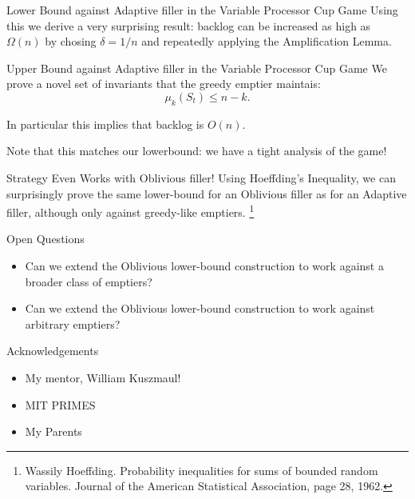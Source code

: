 \documentclass[xcolor=x11names, svgnames, rgb]{beamer}
\begin{document}
\begin{frame}[t]{Lower Bound against Adaptive filler in the Variable Processor Cup Game}
  Using this we derive a very surprising result: backlog can be increased as
  high as $\Omega(n)$ by chosing $\delta = 1/n$ and repeatedly applying the
  Amplification Lemma.
  
\end{frame}

\begin{frame}[t]{Upper Bound against Adaptive filler in the Variable Processor Cup Game}
  We prove a novel set of invariants that the greedy emptier maintais: 
  $$\mu_k(S_t) \le n-k.$$

  \vspace{0.3cm}
  In particular this implies that backlog is $O(n)$. 

  \vspace{0.3cm}
  Note that this matches our lowerbound: we have a tight analysis of the game!
  
\end{frame}

\begin{frame}[t]{Strategy Even Works with Oblivious filler!}
  Using Hoeffding's Inequality, we can surprisingly prove the same lower-bound
  for an Oblivious filler as for an Adaptive filler, although only against
  greedy-like emptiers.
  \footnote{Wassily Hoeffding. Probability inequalities for sums of bounded random variables. Journal of the American Statistical Association, page 28, 1962.}
\end{frame}

\begin{frame}[t]{Open Questions}
  \begin{itemize}
    \item Can we extend the Oblivious lower-bound construction to work against a broader class of emptiers?
    \item Can we extend the Oblivious lower-bound construction to work against arbitrary emptiers?
  \end{itemize}
\end{frame}

\begin{frame}[t]{Acknowledgements}
  \begin{itemize}
    \item My mentor, William Kuszmaul!
    \item MIT PRIMES
    \item My Parents
 \end{itemize} 
\end{frame}
\end{document}
